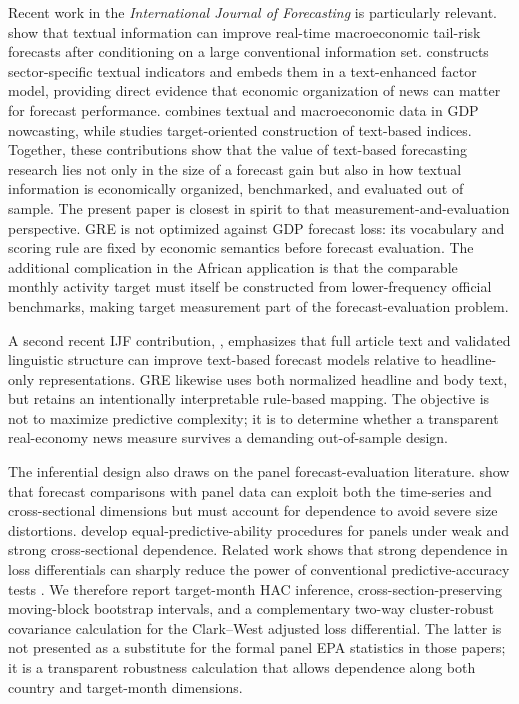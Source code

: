 \documentclass[preprint,12pt,authoryear]{elsarticle}
\begin{document}
Recent work in the \emph{International Journal of Forecasting} is particularly relevant. \citet{adaemmer2025} show that textual information can improve real-time macroeconomic tail-risk forecasts after conditioning on a large conventional information set. \citet{seo2025} constructs sector-specific textual indicators and embeds them in a text-enhanced factor model, providing direct evidence that economic organization of news can matter for forecast performance. \citet{zheng2024} combines textual and macroeconomic data in GDP nowcasting, while \citet{ardia2026} studies target-oriented construction of text-based indices. Together, these contributions show that the value of text-based forecasting research lies not only in the size of a forecast gain but also in how textual information is economically organized, benchmarked, and evaluated out of sample. The present paper is closest in spirit to that measurement-and-evaluation perspective. GRE is not optimized against GDP forecast loss: its vocabulary and scoring rule are fixed by economic semantics before forecast evaluation. The additional complication in the African application is that the comparable monthly activity target must itself be constructed from lower-frequency official benchmarks, making target measurement part of the forecast-evaluation problem.

A second recent IJF contribution, \citet{abeyie2026}, emphasizes that full article text and validated linguistic structure can improve text-based forecast models relative to headline-only representations. GRE likewise uses both normalized headline and body text, but retains an intentionally interpretable rule-based mapping. The objective is not to maximize predictive complexity; it is to determine whether a transparent real-economy news measure survives a demanding out-of-sample design.

The inferential design also draws on the panel forecast-evaluation literature. \citet{qu2024} show that forecast comparisons with panel data can exploit both the time-series and cross-sectional dimensions but must account for dependence to avoid severe size distortions. \citet{akgun2024} develop equal-predictive-ability procedures for panels under weak and strong cross-sectional dependence. Related work shows that strong dependence in loss differentials can sharply reduce the power of conventional predictive-accuracy tests \citep{coroneo2025}. We therefore report target-month HAC inference, cross-section-preserving moving-block bootstrap intervals, and a complementary two-way cluster-robust covariance calculation for the Clark--West adjusted loss differential. The latter is not presented as a substitute for the formal panel EPA statistics in those papers; it is a transparent robustness calculation that allows dependence along both country and target-month dimensions.
\end{document}
